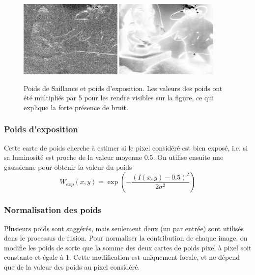 \documentclass[twoside]{article}
\begin{document}
\begin{figure}[]
  \centering
  \includegraphics[width=0.45\textwidth]{Support/saliency.png}
  \includegraphics[width=0.45\textwidth]{Support/exposedness.png}
  \caption{Poids de Saillance et poids d'exposition. Les valeurs des poids ont été multipliés par 5 pour les rendre visibles sur la figure, ce qui explique la forte présence de bruit.}
\end{figure}

\subsubsection{Poids d'exposition}
Cette carte de poids cherche à estimer si le pixel considéré est bien exposé, i.e. si sa luminosité est proche de la valeur moyenne $0.5$. On utilise ensuite une gaussienne pour obtenir la valeur du poids $$W_{exp}(x,y) = \exp\left(-\frac{(I(x,y) - 0.5)^2}{2\sigma^2}\right)$$

 \subsubsection{Normalisation des poids}
Plusieurs poids sont suggérés, mais seulement deux (un par entrée) sont utilisés dans le processus de fusion. Pour normaliser la contribution de chaque image, on modifie les poids de sorte que la somme des deux cartes de poids pixel à pixel soit constante et égale à $1$. Cette modification est uniquement locale, et ne dépend que de la valeur des poids au pixel considéré.
\end{document}
